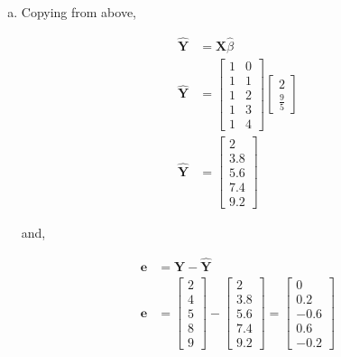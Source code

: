 \documentclass[12pt,letterpaper, onecolumn]{exam}
\begin{document}
\begin{questions}
    \begin{solution}

    \begin{enumerate}[a.)]
        \item Copying from above,

        \begin{align*}
            \hat{\textbf{Y}} &= \textbf{X}\hat{\beta} \\ 
             \hat{\textbf{Y}}&= \left [\begin{array}{cc}
                1 & 0 \\
                1 & 1 \\
                1 & 2 \\
                1 & 3 \\
                1 & 4
            \end{array} \right]\left [\begin{array}{c}
                2 \\ \frac{9}{5}
            \end{array} \right] \\
             \hat{\textbf{Y}} & = \left[\begin{array}{c}
                2  \\
                3.8  \\
                5.6  \\
                7.4  \\
                9.2 
            \end{array} \right]
        \end{align*}

        and,

        \begin{align*}
            \textbf{e}&=\textbf{Y}- \hat{\textbf{Y}} \\
            \textbf{e} & = \left[\begin{array}{c}
                2  \\
                4  \\
                5  \\
                8  \\
                9 
            \end{array} \right] - \left[\begin{array}{c}
                2  \\
                3.8  \\
                5.6  \\
                7.4  \\
                9.2 
            \end{array} \right] = \left[\begin{array}{c}
                0  \\
                0.2  \\
                -0.6  \\
                0.6  \\
                -0.2 
            \end{array} \right]
        \end{align*}


\end{enumerate}
\end{solution}
\end{questions}
\end{document}

